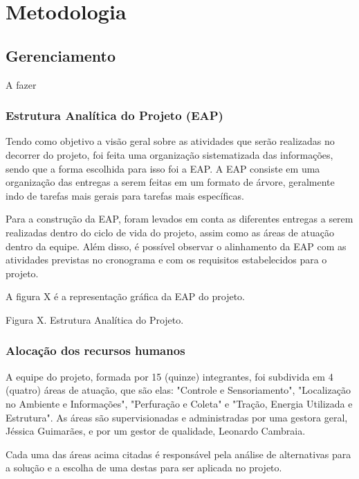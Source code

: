 \chapter[Metodologia]{Metodologia}

\section{Gerenciamento}

A fazer

\subsection{Estrutura Analítica do Projeto (EAP)}

Tendo como objetivo a visão geral sobre as atividades que serão realizadas no decorrer do projeto, foi feita uma organização sistematizada das informações, sendo que a forma escolhida para isso foi a EAP. A EAP consiste em uma organização das entregas a serem feitas em um formato de árvore, geralmente indo de tarefas mais gerais para tarefas mais específicas.

Para a construção da EAP, foram levados em conta as diferentes entregas a serem realizadas dentro do ciclo de vida do projeto, assim como as áreas de atuação dentro da equipe. Além disso, é possível observar o alinhamento da EAP com as atividades previstas no cronograma e com os requisitos estabelecidos para o projeto.

A figura X é a representação gráfica da EAP do projeto.

Figura X. Estrutura Analítica do Projeto.

\subsection{Alocação dos recursos humanos}

A equipe do projeto, formada por 15 (quinze) integrantes, foi subdivida em 4 (quatro) áreas de atuação, que são elas: "Controle e Sensoriamento", "Localização no Ambiente e Informações", "Perfuração e Coleta" e "Tração, Energia Utilizada e Estrutura". As áreas são supervisionadas e administradas por uma gestora geral, Jéssica Guimarães, e por um gestor de qualidade, Leonardo Cambraia.

Cada uma das áreas acima citadas é responsável pela análise de alternativas para a solução e a escolha de uma destas para ser aplicada no projeto.

